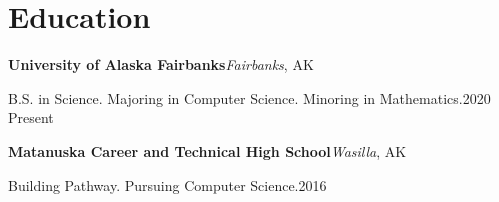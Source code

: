 ﻿\section{Education}

{\textbf{University of Alaska Fairbanks}}\hfill{\textit{Fairbanks}, AK}

{B.S. in Science. Majoring in Computer Science. Minoring in Mathematics.}\hfill{2020 \textendash\! Present}

\bigbreak

{\textbf{Matanuska Career and Technical High School}}\hfill{\textit{Wasilla}, AK}

{Building Pathway. Pursuing Computer Science.}\hfill{2016 \textendash{}}